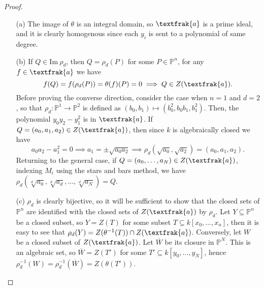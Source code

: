 \documentclass[12pt]{article}
\newcommand{\goth}[1]{\textfrak{#1}}
\newcommand{\Img}[1]{\text{Im}~#1}
\newcommand{\PP}{\mathbb{P}}
\theoremstyle{definition}
\begin{document}
\begin{enumerate} [label=\textbf{\arabic*.}, leftmargin=-0.05em]
\begin{proof} $ $ \vspace{0pt}
    \begin{itemize}
        \item[(a)] The image of $\theta$ is an integral domain, so $\goth{a}$ is a prime ideal, and it is clearly homogenous since each $y_i$ is sent to a polynomial of same degree.

        \item[(b)] If $Q \in \Img{\rho_d}$, then $Q = \rho_d(P)$ for some $P \in \PP^n$, for any $f \in \goth{a}$ we have
        \begin{equation*}
            f(Q) = f(\rho_d(P)) = \theta(f)(P) = 0 \implies Q \in Z(\goth{a}).
        \end{equation*}
        Before proving the converse direction, consider the case when $n = 1$ and $d = 2$, so that $\rho_d : \PP^1 \to \PP^2$ is defined as $(b_0, b_1) \mapsto (b_0^2, b_0 b_1, b_1^2)$. Then, the polynomial $y_0 y_2 - y_1^2$ is in $\goth{a}$. If $Q = (a_0, a_1, a_2) \in Z(\goth{a})$, then since $k$ is algebraically closed we have
        \begin{equation*}
            a_0 a_2 - a_1^2 = 0 \implies a_1 = \pm \sqrt{a_0 a_2} \implies \rho_d(\sqrt{a_0}, \sqrt{a_2}) = (a_0, a_1, a_2).
        \end{equation*}
        Returning to the general case, if $Q = (a_0, \dots, a_N) \in Z(\goth{a})$, indexing $M_i$ using the stars and bars method, we have $\rho_d(\sqrt[d]{a_0}, \sqrt[d]{a_d}, \dots, \sqrt[d]{a_N}) = Q$.

        \item[(c)] $\rho_d$ is clearly bijective, so it will be sufficient to show that the closed sets of $\PP^n$ are identified with the closed sets of $Z(\goth{a})$ by $\rho_d$. Let $Y \subseteq \PP^n$ be a closed subset, so $Y = Z(T)$ for some subset $T \subseteq k[x_0, \dots, x_n]$, then it is easy to see that $\rho_d(Y) = Z(\theta^{-1}(T)) \cap Z(\goth{a})$. Conversely, let $W$ be a closed subset of $Z(\goth{a})$. Let $\overline{W}$ be its closure in $\PP^N$. This is an algebraic set, so $\overline{W} = Z(T')$ for some $T' \subseteq k[y_0, \dots, y_N]$, hence $\rho_d^{-1}(W) = \rho_d^{-1}(\overline{W}) = Z(\theta(T'))$.


\end{itemize}
\end{proof}
\end{enumerate}
\end{document}
